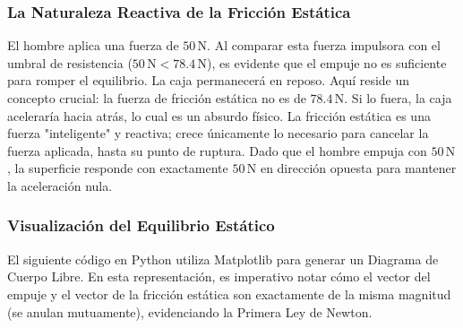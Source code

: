 \documentclass[12pt]{article}
\begin{document}
\subsubsection*{La Naturaleza Reactiva de la Fricción Estática}
El hombre aplica una fuerza de $50 \, \text{N}$. Al comparar esta fuerza impulsora con el umbral de resistencia ($50 \, \text{N} < 78.4 \, \text{N}$), es evidente que el empuje no es suficiente para romper el equilibrio. La caja permanecerá en reposo.
Aquí reside un concepto crucial: la fuerza de fricción estática no es de $78.4 \, \text{N}$. Si lo fuera, la caja aceleraría hacia atrás, lo cual es un absurdo físico. La fricción estática es una fuerza "inteligente" y reactiva; crece únicamente lo necesario para cancelar la fuerza aplicada, hasta su punto de ruptura. Dado que el hombre empuja con $50 \, \text{N}$, la superficie responde con exactamente $50 \, \text{N}$ en dirección opuesta para mantener la aceleración nula.

\subsubsection*{Visualización del Equilibrio Estático}
El siguiente código en Python utiliza Matplotlib para generar un Diagrama de Cuerpo Libre. En esta representación, es imperativo notar cómo el vector del empuje y el vector de la fricción estática son exactamente de la misma magnitud (se anulan mutuamente), evidenciando la Primera Ley de Newton.
\end{document}
